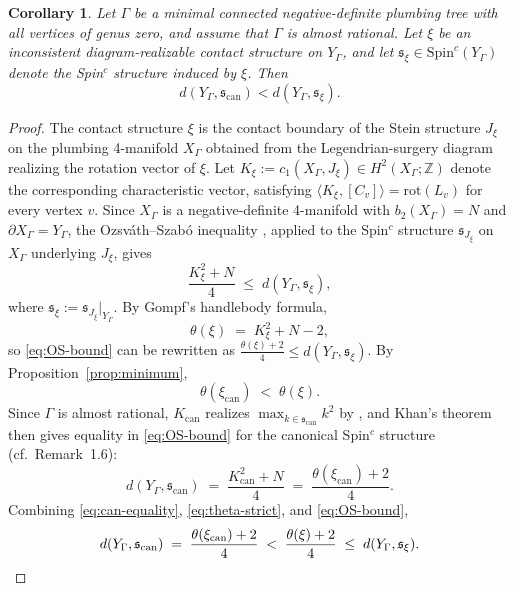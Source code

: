\documentclass[11pt]{amsart}
\theoremstyle{plain}
\newtheorem{corollary}[theorem]{Corollary}
\theoremstyle{definition}
\theoremstyle{remark}
\begin{document}
\begin{corollary}\label{cor:d-strict}
Let $\Gamma$ be a minimal connected negative-definite plumbing tree with all 
vertices of genus zero, and assume that $\Gamma$ is almost rational. Let $\xi$ 
be an inconsistent diagram-realizable contact structure on $Y_\Gamma$, and let 
$\mathfrak{s}_\xi \in \mathrm{Spin}^c(Y_\Gamma)$ denote the Spin$^c$ structure 
induced by $\xi$. Then
\[
d(Y_\Gamma, \mathfrak{s}_{\mathrm{can}}) < d(Y_\Gamma, \mathfrak{s}_\xi).
\]
\end{corollary}

\begin{proof}
The contact structure $\xi$ is 
the contact boundary of the Stein structure $J_\xi$ on the plumbing 4-manifold 
$X_\Gamma$ obtained from the Legendrian-surgery diagram realizing the rotation 
vector of $\xi$. Let $K_\xi := c_1(X_\Gamma, J_\xi) \in H^2(X_\Gamma; \mathbb{Z})$ 
denote the corresponding characteristic vector, satisfying 
$\langle K_\xi, [C_v]\rangle = \mathrm{rot}(L_v)$ for every vertex $v$. Since 
$X_\Gamma$ is a negative-definite 4-manifold with $b_2(X_\Gamma) = N$ and 
$\partial X_\Gamma = Y_\Gamma$, the Ozsv\'ath--Szab\'o inequality 
\cite[Theorem~9.6]{OzsvathSzabo2003abs}, applied to the Spin$^c$ structure 
$\mathfrak{s}_{J_\xi}$ on $X_\Gamma$ underlying $J_\xi$, gives
\begin{equation}\label{eq:OS-bound}
\frac{K_\xi^2 + N}{4} \;\leq\; d(Y_\Gamma, \mathfrak{s}_\xi),
\end{equation}
where $\mathfrak{s}_\xi := \mathfrak{s}_{J_\xi}|_{Y_\Gamma}$. By Gompf's 
handlebody formula,
\begin{equation}\label{eq:theta-K}
\theta(\xi) \;=\; K_\xi^2 + N - 2,
\end{equation}
so \eqref{eq:OS-bound} can be rewritten as 
$\frac{\theta(\xi) + 2}{4} \leq d(Y_\Gamma, \mathfrak{s}_\xi)$. 
By Proposition~\ref{prop:minimum},
\begin{equation}\label{eq:theta-strict}
\theta(\xi_{\mathrm{can}}) \;<\; \theta(\xi).
\end{equation}
Since $\Gamma$ is almost rational, $K_{\mathrm{can}}$ realizes 
$\max_{k \in \mathfrak{s}_{\mathrm{can}}} k^2$ by 
\cite[Theorem~6.3]{Nemethi2005}, and Khan's theorem \cite{Khan2026} then gives 
equality in \eqref{eq:OS-bound} for the canonical Spin$^c$ structure 
(cf.\ Remark~1.6):
\begin{equation}\label{eq:can-equality}
d(Y_\Gamma, \mathfrak{s}_{\mathrm{can}}) 
\;=\; \frac{K_{\mathrm{can}}^2 + N}{4}
\;=\; \frac{\theta(\xi_{\mathrm{can}}) + 2}{4}.
\end{equation}
Combining \eqref{eq:can-equality}, \eqref{eq:theta-strict}, and 
\eqref{eq:OS-bound},
\[
d(Y_\Gamma, \mathfrak{s}_{\mathrm{can}}) 
\;=\; \frac{\theta(\xi_{\mathrm{can}}) + 2}{4} 
\;<\; \frac{\theta(\xi) + 2}{4} 
\;\leq\; d(Y_\Gamma, \mathfrak{s}_\xi). \qedhere
\]
\end{proof}
\end{document}
